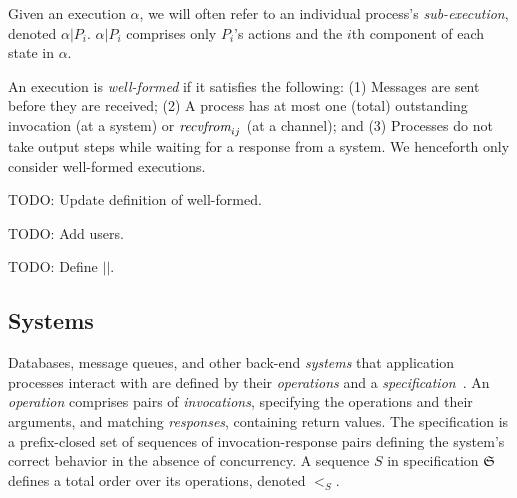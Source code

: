 Given an execution $\alpha$, we will often refer to an individual process's
\textit{sub-execution}, denoted $\alpha|P_i$. $\alpha|P_i$ comprises
only $P_i$'s actions and the $i$th component of each state in $\alpha$.

 An execution is \textit{well-formed} if it
satisfies the following: (1) Messages are sent before they are received; (2) A
process has at most one (total) outstanding invocation (at a system)
or $\operatorname*{\textit{recvfrom}}_{ij}$ (at a channel); and (3) Processes do not take output steps while
waiting for a response from a system. We henceforth only consider well-formed executions.

TODO: Update definition of well-formed.

TODO: Add users.

TODO: Define $||$.

\subsection{Systems}
\label{sec:mdl:systems}

Databases, message queues, and other back-end \textit{systems} that application
processes interact with are defined by their \textit{operations} and a
\textit{specification}~\cite{herlihy1990linearizability,lynch1996da}. An
\textit{operation} comprises pairs of \textit{invocations}, specifying the
operations and their arguments, and matching \textit{responses}, containing
return values. The specification is a prefix-closed set of sequences of
invocation-response pairs defining the system's correct behavior in the absence
of concurrency. A sequence $S$ in specification $\mathfrak{S}$ defines a total order
over its operations, denoted $<_S$.

